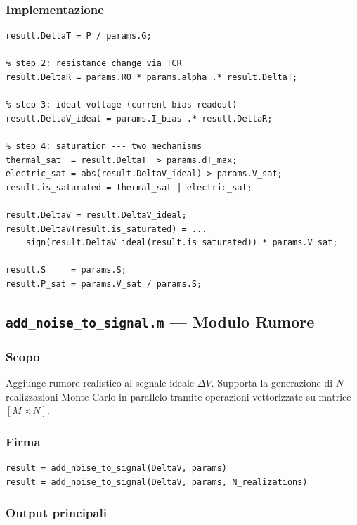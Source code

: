 \documentclass[11pt,a4paper]{article}
\begin{document}
\subsubsection*{Implementazione}

\begin{lstlisting}[caption={forward\_model.m --- corpo principale}]
% step 1: thermal balance (steady-state)
result.DeltaT = P / params.G;

% step 2: resistance change via TCR
result.DeltaR = params.R0 * params.alpha .* result.DeltaT;

% step 3: ideal voltage (current-bias readout)
result.DeltaV_ideal = params.I_bias .* result.DeltaR;

% step 4: saturation --- two mechanisms
thermal_sat  = result.DeltaT  > params.dT_max;
electric_sat = abs(result.DeltaV_ideal) > params.V_sat;
result.is_saturated = thermal_sat | electric_sat;

result.DeltaV = result.DeltaV_ideal;
result.DeltaV(result.is_saturated) = ...
    sign(result.DeltaV_ideal(result.is_saturated)) * params.V_sat;

result.S     = params.S;
result.P_sat = params.V_sat / params.S;
\end{lstlisting}

\subsection{\texttt{add\_noise\_to\_signal.m} --- Modulo Rumore}

\subsubsection*{Scopo}
Aggiunge rumore realistico al segnale ideale $\Delta V$.
Supporta la generazione di $N$ realizzazioni Monte Carlo in parallelo
tramite operazioni vettorizzate su matrice $[M \times N]$.

\subsubsection*{Firma}
\begin{lstlisting}
result = add_noise_to_signal(DeltaV, params)
result = add_noise_to_signal(DeltaV, params, N_realizations)
\end{lstlisting}

\subsubsection*{Output principali}
\end{document}
